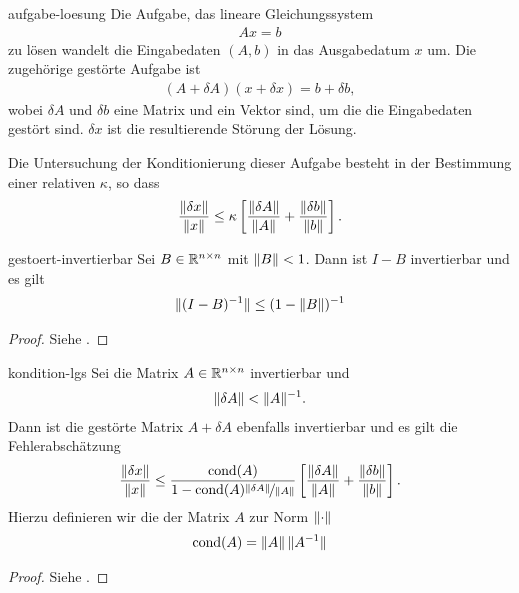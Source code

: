 \begin{Definition}{aufgabe-loesung}
  Die Aufgabe, das lineare Gleichungssystem
  \begin{gather}
    Ax=b
  \end{gather}
  zu lösen wandelt die Eingabedaten $(A,b)$ in das Ausgabedatum $x$
  um. Die zugehörige gestörte Aufgabe ist
  \begin{gather}
    (A+\delta A) (x+\delta x) = b+ \delta b,
  \end{gather}
  wobei $\delta A$ und $\delta b$ eine Matrix und ein Vektor sind, um
  die die Eingabedaten gestört sind. $\delta x$ ist die resultierende
  Störung der Lösung.
  
  Die Untersuchung der Konditionierung dieser Aufgabe besteht in
  der Bestimmung einer relativen  $\kappa$, so dass
  \begin{gather}
    \frac{\lVert\delta x\rVert}{\lVert x\rVert}
    \le \kappa \left[\frac{\lVert\delta A\rVert}{\lVert A\rVert}
      +\frac{\lVert\delta b\rVert}{\lVert b\rVert}\right].
  \end{gather}
\end{Definition}

\begin{Lemma}{gestoert-invertierbar}
  Sei $B\in \mathbb R^{n\times n}$ mit $\lVert B\rVert < 1$. Dann ist $I-B$
  invertierbar und es gilt
  \begin{gather}
    \lVert(I-B)^{-1}\rVert \le (1-\lVert B\rVert)^{-1}
  \end{gather}
\end{Lemma}

\begin{proof}
  Siehe \cite[Hilfssatz 4.4]{Rannacher17}.
\end{proof}

\begin{Satz}{kondition-lgs}
  Sei die Matrix $A\in\mathbb R^{n\times n}$ invertierbar und
  \begin{gather}
    \lVert\delta A\rVert < \lVert A\rVert^{-1}.
  \end{gather}
  Dann ist die gestörte Matrix $A+\delta A$ ebenfalls invertierbar und
  es gilt die Fehlerabschätzung
  \begin{gather}
    \frac{\lVert\delta x\rVert}{\lVert x\rVert}
    \le \frac{\operatorname{cond}(A)}{1-\operatorname{cond}(A)\nicefrac{\lVert\delta A\rVert}{\lVert A\rVert}}
    \left[\frac{\lVert\delta A\rVert}{\lVert A\rVert}
      +\frac{\lVert\delta b\rVert}{\lVert b\rVert}\right].
  \end{gather}
  Hierzu definieren wir die  der Matrix $A$ zur
  Norm $\lVert\cdot\rVert$
  \begin{gather}
    \operatorname{cond}(A) = \lVert A\rVert \,\lVert A^{-1}\rVert
  \end{gather}
\end{Satz}

\begin{proof}
  Siehe \cite[Satz 4.1]{Rannacher17}.
\end{proof}

